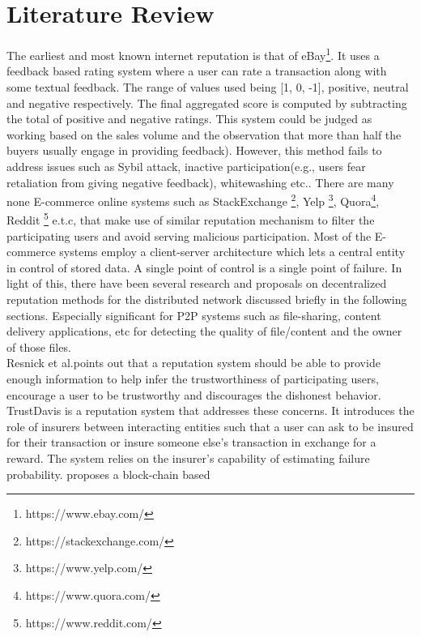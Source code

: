 \chapter{Literature Review} \label{ch:litrev}
The earliest and most known internet reputation is that of
eBay\footnote{https://www.ebay.com/}. It uses a feedback based rating system
where a user can rate a transaction along with some textual feedback. The range
of values used being [1, 0, -1], positive, neutral and negative respectively.
The final aggregated score is computed by subtracting the total of positive and
negative ratings. This system \cite{resnick2002trust} \cite{resnick2006value}
could be judged as working based on the sales volume and the observation that
more than half the buyers usually engage in providing feedback). However, this
method fails to address issues such as Sybil attack, inactive
participation(e.g., users fear retaliation from giving negative feedback),
whitewashing etc..  There are many none E-commerce online systems such as
StackExchange \footnote{https://stackexchange.com/}, Yelp
\footnote{https://www.yelp.com/}, Quora\footnote{https://www.quora.com/},
Reddit \footnote{https://www.reddit.com/} e.t.c, that make use of similar
reputation mechanism to filter the participating users and avoid serving
malicious participation. Most of the E-commerce systems employ a client-server
architecture which lets a central entity in control of stored data.  A single
point of control is a single point of failure. In light of this, there have
been several research and proposals on decentralized reputation methods for the
distributed network discussed briefly in the following sections. Especially
significant for P2P systems such as file-sharing, content delivery
applications, etc for detecting the quality of file/content and the owner of
those files.\\
Resnick et al.\cite{resnick2000reputation}points out that a reputation system
should be able to provide enough information to help infer the trustworthiness
of participating users, encourage a user to be trustworthy and discourages the
dishonest behavior. TrustDavis \cite{defigueiredo2005trustdavis} is a
reputation system that addresses these concerns. It introduces the role of
insurers between interacting entities such that a user can ask to be insured
for their transaction or insure someone else's transaction in exchange for a
reward. The system relies on the insurer's capability of estimating failure
probability.  \cite{schaub2016trustless} proposes a block-chain based
